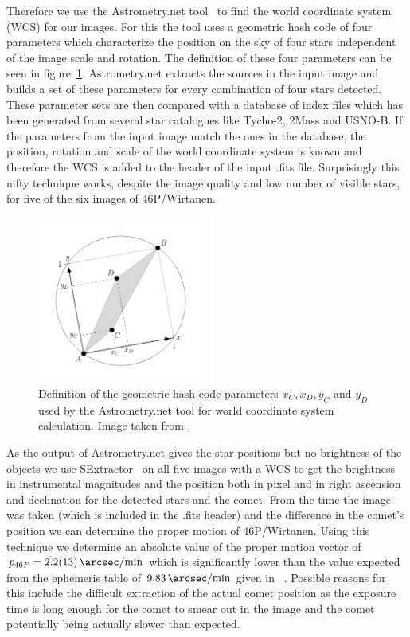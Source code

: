 \documentclass{article}
\begin{document}
Therefore we use the Astrometry.net tool~\parencite{Astrometry} to find the world coordinate system (WCS) for our images. For this the tool uses a geometric hash code of four parameters which characterize the position on the sky of four stars independent of the image scale and rotation. The definition of these four parameters can be seen in figure~\ref{fig:quad}. Astrometry.net extracts the sources in the input image and builds a set of these parameters for every combination of four stars detected. These parameter sets are then compared with a database of index files which has been generated from several star catalogues like Tycho-2, 2Mass and USNO-B. If the parameters from the input image match the ones in the database, the position, rotation and scale of the world coordinate system is known and therefore the WCS is added to the header of the input .fits file. Surprisingly this nifty technique works, despite the image quality and low number of visible stars, for five of the six images of 46P/Wirtanen. 

\begin{figure}[H]
    \centering
    \includegraphics[width=0.5\textwidth]{Comet/quad.png}
    \caption{Definition of the geometric hash code parameters $x_C, x_D, y_C$ and $y_D$ used by the Astrometry.net tool for world coordinate system calculation. Image taken from \parencite{Astrometry}.}
    \label{fig:quad}
\end{figure}

As the output of Astrometry.net gives the star positions but no brightness of the objects we use SExtractor~\parencite{SExtractor} on all five images with a WCS to get the brightness in instrumental magnitudes and the position both in pixel and in right ascension and declination for the detected stars and the comet. From the time the image was taken (which is included in the .fits header) and the difference in the comet's position we can determine the proper motion of 46P/Wirtanen. Using this technique we determine an absolute value of the proper motion vector of $p_{46P} = \SI{2.2 \pm 1.3}{\arcsec \per \minute}$ which is significantly lower than the value expected from the ephemeris table of $\SI{9.83}{\arcsec \per \minute}$ given in ~\parencite{wirtanen}. Possible reasons for this include the difficult extraction of the actual comet position as the exposure time is long enough for the comet to smear out in the image and the comet potentially being actually slower than expected.
\end{document}
